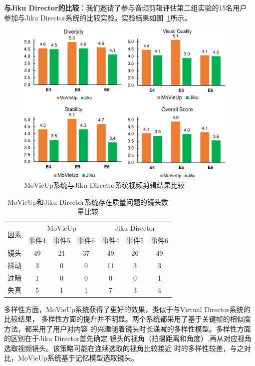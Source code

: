 \documentclass[doctor]{ustcthesis}
\begin{document}
\textbf{与Jiku Director的比较}：我们邀请了参与音频剪辑评估第二组实验的15名用户
参加与Jiku Director系统的比较实验。实验结果如图~\ref{fig:mashup-comp-jiku}所示。

\begin{figure}[ht]
    \centering
    \includegraphics[clip=true, width=0.95\textwidth]{mashup-comp-jiku.pdf}
    \caption{MoVieUp系统与Jiku Director系统视频剪辑结果比较}
    \label{fig:mashup-comp-jiku}
    \vspace{-2em}
\end{figure}

\begin{table}[ht]
    \centering
    \caption{MoVieUp和Jiku Director系统存在质量问题的镜头数量比较}
    \label{tab:mashup-jiku-obj-comp}
    \begin{tabular}{|c|c|c|c|c|c|c|}
        \hline
        \multirow{2}{*}{因素} & \multicolumn{3}{c|}{MoVieUp} &
        \multicolumn{3}{c|}{Jiku Director}  \\ \cline{2-7}
        & 事件4 & 事件5 & 事件6 & 事件4 & 事件5 & 事件6 \\ \hline
        镜头		& 49 & 21 & 37 & 49 & 26& 49 \\ \hline
        抖动	& 3 & 0 & 0 & 11 & 3& 3 \\ \hline
        过暗	& 1 & 0 & 0 & 0 & 0& 1 \\ \hline
        失真	& 5 & 1 & 1 & 7 & 3& 4 \\ \hline
    \end{tabular}
\end{table}
多样性方面，MoVieUp系统获得了更好的效果，类似于与Virtual Director系统的比较结果，
多样性方面的提升并不明显。两个系统都采用了基于关键帧的相似度方法，都采用了用户对内容
的兴趣随着镜头时长递减的多样性模型。多样性方面的区别在于Jiku Director首先确定
镜头的视角（拍摄距离和角度）,再从对应视角选取视频镜头。该策略可能在连续选取的视角比较接近
时的多样性较差，与之对比，MoVieUp系统基于记忆模型选取镜头。
\end{document}
